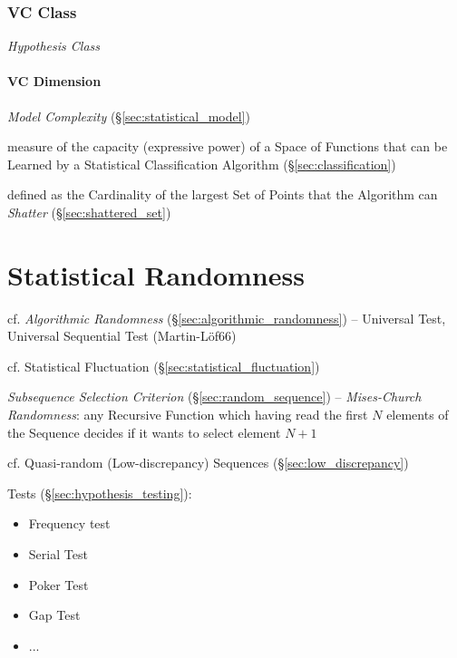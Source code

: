 \subsubsection{VC Class}\label{sec:vc_class}

\emph{Hypothesis Class}



\paragraph{VC Dimension}\label{sec:vc_dimension}\hfill

\emph{Model Complexity} (\S\ref{sec:statistical_model})

measure of the capacity (expressive power) of a Space of Functions that can be
Learned by a Statistical Classification Algorithm (\S\ref{sec:classification})

defined as the Cardinality of the largest Set of Points that the Algorithm can
\emph{Shatter} (\S\ref{sec:shattered_set})



\section{Statistical Randomness}\label{sec:statistical_randomness}

cf. \emph{Algorithmic Randomness} (\S\ref{sec:algorithmic_randomness}) --
Universal Test, Universal Sequential Test (Martin-L\"of66)

cf. Statistical Fluctuation (\S\ref{sec:statistical_fluctuation})

\emph{Subsequence Selection Criterion} (\S\ref{sec:random_sequence}) --
\emph{Mises-Church Randomness}: any Recursive Function which having read the
first $N$ elements of the Sequence decides if it wants to select element $N+1$

cf. Quasi-random (Low-discrepancy) Sequences (\S\ref{sec:low_discrepancy})

Tests (\S\ref{sec:hypothesis_testing}):
\begin{itemize}
  \item Frequency test
  \item Serial Test
  \item Poker Test
  \item Gap Test
  \item ...
\end{itemize}

